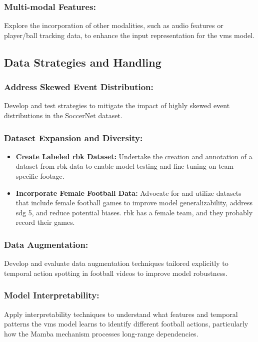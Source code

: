\subsubsection{Multi-modal Features:} 
Explore the incorporation of other modalities, such as audio features or player/ball tracking data, to enhance the input representation for the \acrshort{vms} model.

\subsection{Data Strategies and Handling}

\subsubsection{Address Skewed Event Distribution:} Develop and test strategies to mitigate the impact of highly skewed event distributions in the SoccerNet dataset.

\subsubsection{Dataset Expansion and Diversity:}
    \begin{itemize}
        \item \textbf{Create Labeled \acrfull{rbk} Dataset:} Undertake the creation and annotation of a dataset from \acrshort{rbk} data to enable model testing and fine-tuning on team-specific footage.
        \item \textbf{Incorporate Female Football Data:} Advocate for and utilize datasets that include female football games to improve model generalizability, address \acrshort{sdg} 5, and reduce potential biases. \acrshort{rbk} has a female team, and they probably record their games. 
    \end{itemize}
    
\subsubsection{Data Augmentation:} Develop and evaluate data augmentation techniques tailored explicitly to temporal action spotting in football videos to improve model robustness.

\subsubsection{Model Interpretability:} Apply interpretability techniques to understand what features and temporal patterns the \acrshort{vms} model learns to identify different football actions, particularly how the Mamba mechanism processes long-range dependencies.

